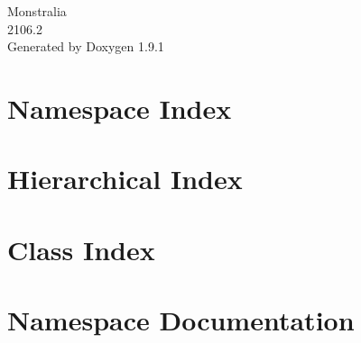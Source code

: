 \let\mypdfximage\pdfximage\def\pdfximage{\immediate\mypdfximage}\documentclass[twoside]{book}
\newcommand{\+}{\discretionary{\mbox{\scriptsize$\hookleftarrow$}}{}{}}
\newcommand{\clearemptydoublepage}{%
  \newpage{\pagestyle{empty}\cleardoublepage}%
}
\begin{document}
\raggedbottom

\hypersetup{pageanchor=false,
             bookmarksnumbered=true,
             pdfencoding=unicode
            }
\begin{titlepage}
\vspace*{7cm}
\begin{center}%
{\Large Monstralia \\[1ex]\large 2106.\+2 }\\
\vspace*{1cm}
{\large Generated by Doxygen 1.9.1}\\
\end{center}
\end{titlepage}
\clearemptydoublepage
{}
\tableofcontents
\clearemptydoublepage
{}
\hypersetup{pageanchor=true}

\chapter{Namespace Index}

\chapter{Hierarchical Index}

\chapter{Class Index}

\chapter{Namespace Documentation}





\end{document}
